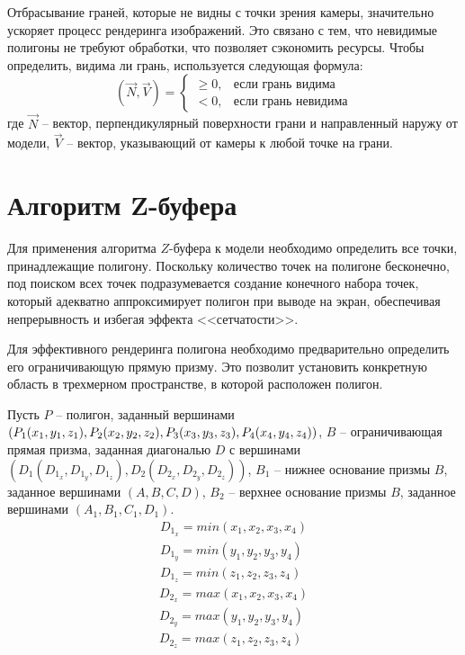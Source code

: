 Отбрасывание граней, которые не видны с точки зрения камеры, значительно ускоряет процесс рендеринга изображений. Это связано с тем, что невидимые полигоны не требуют обработки, что позволяет сэкономить ресурсы. Чтобы определить, видима ли грань, используется следующая формула:
\begin{equation}
	(\vec{N}, \vec{V}) =
	\begin{cases}
		\geq 0, & \text{если грань видима} \\
		< 0, & \text{если грань невидима}
	\end{cases}
\end{equation}
где $\vec{N}$ -- вектор, перпендикулярный поверхности грани и направленный наружу от модели, $\vec{V}$ -- вектор, указывающий от камеры к любой точке на грани.

\section{Алгоритм Z-буфера}

Для применения алгоритма $Z$-буфера к модели необходимо определить все точки, принадлежащие полигону. Поскольку количество точек на полигоне бесконечно, под поиском всех точек подразумевается создание конечного набора точек, который адекватно аппроксимирует полигон при выводе на экран, обеспечивая непрерывность и избегая эффекта <<сетчатости>>.

Для эффективного рендеринга полигона необходимо предварительно определить его ограничивающую прямую призму. Это позволит установить конкретную область в трехмерном пространстве, в которой расположен полигон.

Пусть $P$ -- полигон, заданный вершинами $(P_1(x_1, y_1, z_1), P_2(x_2, y_2, z_2), \\ P_3(x_3, y_3, z_3), P_4(x_4, y_4, z_4))$, $B$ -- ограничивающая прямая призма, заданная диагональю $D$ с вершинами $(D_1(D_{1_x}, D_{1_y}, D_{1_z}), D_2(D_{2_x}, D_{2_y}, D_{2_z}))$, $B_1$ -- нижнее основание  призмы $B$, заданное вершинами $(A, B, C, D)$, $B_2$ -- верхнее основание призмы $B$, заданное вершинами $(A_1, B_1, C_1, D_1)$. 
\begin{equation}
	\begin{aligned}
		D_{1_x} = min(x_1, x_2, x_3, x_4) \\
		D_{1_y} = min(y_1, y_2, y_3, y_4) \\
		D_{1_z} = min(z_1, z_2, z_3, z_4) 
	\end{aligned}
\end{equation} 
\begin{equation}
	\begin{aligned}
		D_{2_x} = max(x_1, x_2, x_3, x_4) \\
		D_{2_y} = max(y_1, y_2, y_3, y_4) \\
		D_{2_z} = max(z_1, z_2, z_3, z_4) 
	\end{aligned}
\end{equation}

